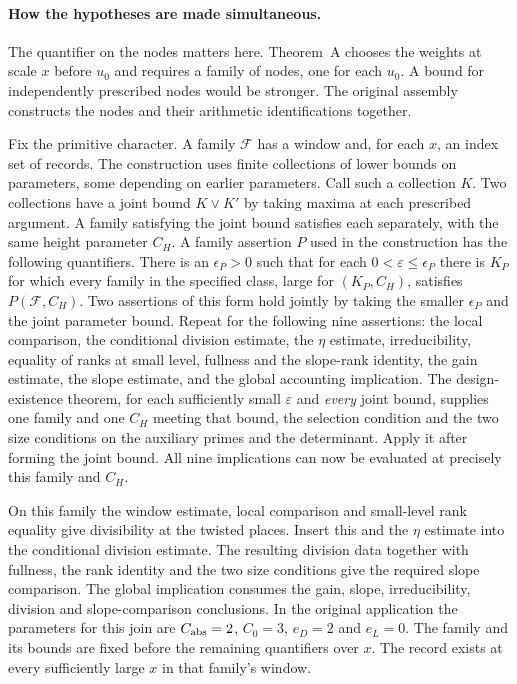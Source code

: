 \paragraph{How the hypotheses are made simultaneous.}\label{assembly:selection}
The quantifier on the nodes matters here. Theorem~A chooses the weights
at scale $x$ before $u_0$ and requires a family of nodes, one for each
$u_0$. A bound for independently prescribed nodes would be stronger.
The original assembly constructs the nodes and their arithmetic
identifications together.

Fix the primitive character. A family $\mathcal F$ has a window and,
for each $x$, an index set of records. The construction uses finite
collections of lower bounds on parameters, some depending on earlier
parameters. Call such a collection $K$. Two collections have a
joint bound $K\vee K'$ by taking maxima at each prescribed argument.
A family satisfying the joint bound satisfies each separately, with
the same height parameter $C_H$. A family assertion $P$ used in the
construction has the following quantifiers. There is an $\epsilon_P>0$ such that for each $0<\varepsilon\le\epsilon_P$
there is $K_P$ for which every family in the specified class, large for
$(K_P,C_H)$, satisfies $P(\mathcal F,C_H)$.
Two assertions of this form hold jointly by taking the smaller
$\epsilon_P$ and the joint parameter bound. Repeat for the following
nine assertions: the local comparison, the conditional division
estimate, the $\eta$ estimate, irreducibility, equality of ranks at
small level, fullness and the slope-rank identity, the gain estimate,
the slope estimate, and the global accounting implication.
The design-existence theorem, for each sufficiently small
$\varepsilon$ and \emph{every} joint bound, supplies one family and
one $C_H$ meeting that bound, the selection condition and the two size
conditions on the auxiliary primes and the determinant. Apply it
after forming the joint bound. All nine implications can now be
evaluated at precisely this family and $C_H$.

On this family the window estimate, local comparison and small-level
rank equality give divisibility at the twisted places. Insert this and
the $\eta$ estimate into the conditional division estimate. The
resulting division data together with fullness, the rank identity
and the two size conditions give the required slope comparison.
The global implication consumes the gain, slope, irreducibility,
division and slope-comparison conclusions. In the original application
the parameters for this join are $C_{\rm abs}=2$, $C_0=3$, $e_D=2$
and $e_L=0$. The family and its bounds are fixed before the remaining
quantifiers over $x$. The record exists at every sufficiently large
$x$ in that family's window.

